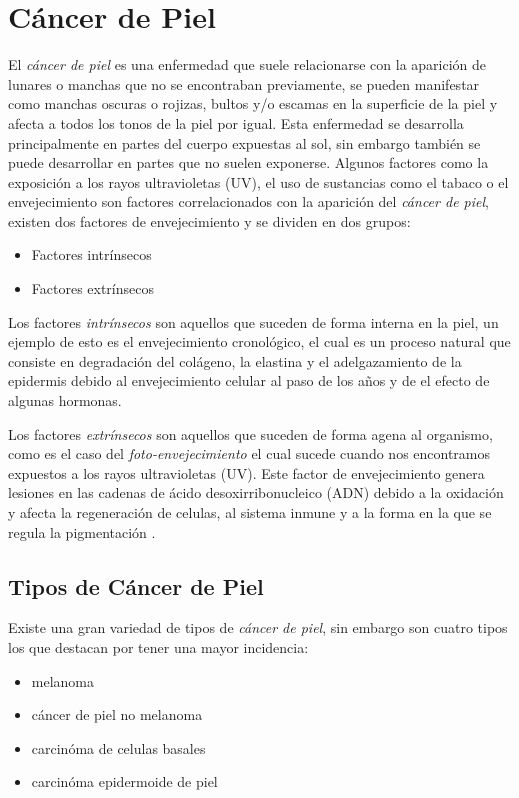 \section{Cáncer de Piel}
El \emph{cáncer de piel} es una enfermedad que suele relacionarse con la aparición de lunares o manchas que no se encontraban previamente, se pueden manifestar como manchas oscuras o rojizas, bultos y/o escamas en la superficie de la piel y afecta a todos los tonos de la piel por igual. Esta enfermedad se desarrolla principalmente en partes del cuerpo expuestas al sol, sin embargo también se puede desarrollar en partes que no suelen exponerse. Algunos factores como la exposición a los rayos ultravioletas (UV), el uso de sustancias como el tabaco o el envejecimiento son factores correlacionados con la aparición del \emph{cáncer de piel}, existen dos factores de envejecimiento y se dividen en dos grupos: 

\begin{itemize}
    \item Factores intrínsecos 
    \item Factores extrínsecos 
\end{itemize}

Los factores \emph{intrínsecos} son aquellos que suceden de forma interna en la piel, un ejemplo de esto es el envejecimiento cronológico, el cual es un proceso natural que consiste en degradación del colágeno, la elastina y el adelgazamiento de la epidermis debido al envejecimiento celular al paso de los años y de el efecto de algunas hormonas.

Los factores \emph{extrínsecos} son aquellos que suceden de forma agena al organismo, como es el caso del \emph{foto-envejecimiento} el cual sucede cuando nos encontramos expuestos a los rayos ultravioletas (UV). Este factor de envejecimiento genera lesiones en las cadenas de ácido desoxirribonucleico (ADN) debido a la oxidación y afecta la regeneración de celulas, al sistema inmune y a la forma en la que se regula la pigmentación \citep{skin_aging}.

\subsection{Tipos de Cáncer de Piel}
Existe una gran variedad de tipos de \emph{cáncer de piel}, sin embargo son cuatro tipos los que destacan por tener una mayor incidencia:

\begin{itemize}
    \item melanoma
    \item cáncer de piel no melanoma
    \item carcinóma de celulas basales
    \item carcinóma epidermoide de piel
\end{itemize}

